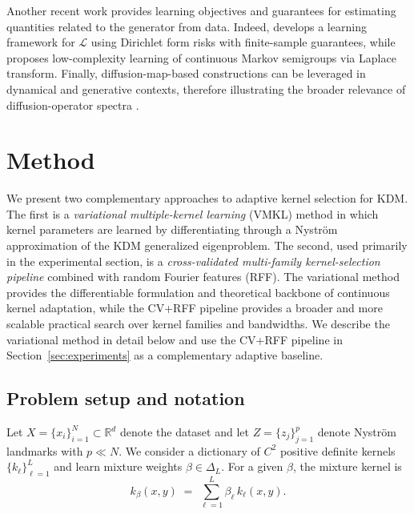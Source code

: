 \documentclass[11pt]{article}
\theoremstyle{remark}
\begin{document}
Another recent work provides learning objectives and guarantees for estimating quantities related to the generator from data. Indeed, \cite{NEURIPS2024_f930c6e1} develops a learning framework for $\mathcal{L}$ using Dirichlet form risks with finite-sample guarantees, while \cite{kostic2025laplacetransformbasedlowcomplexity} proposes low-complexity learning of continuous Markov semigroups via Laplace transform. Finally, diffusion-map-based constructions can be leveraged in dynamical and generative contexts, therefore illustrating the broader relevance of diffusion-operator spectra \citep{li2023diffusion}.

\section{Method}
\label{sec:method}

We present two complementary approaches to adaptive kernel selection for KDM.
The first is a \emph{variational multiple-kernel learning} (VMKL) method in which kernel
parameters are learned by differentiating through a Nystr\"om approximation of the KDM
generalized eigenproblem. The second, used primarily in the experimental section, is a
\emph{cross-validated multi-family kernel-selection pipeline} combined with random Fourier
features (RFF). The variational method provides the differentiable formulation and theoretical
backbone of continuous kernel adaptation, while the CV+RFF pipeline provides a broader and more
scalable practical search over kernel families and bandwidths. We describe the variational method
in detail below and use the CV+RFF pipeline in Section~\ref{sec:experiments} as a complementary adaptive baseline.

\subsection{Problem setup and notation}
\label{subsec:setup}

Let $X=\{x_i\}_{i=1}^N\subset\mathbb{R}^d$ denote the dataset and let $Z=\{z_j\}_{j=1}^p$ denote Nystr\"om landmarks with $p\ll N$.
We consider a dictionary of $C^2$ positive definite kernels $\{k_\ell\}_{\ell=1}^L$ and learn mixture weights $\beta\in\Delta_L$.
For a given $\beta$, the mixture kernel is
\begin{equation}
k_\beta(x,y) \;=\; \sum_{\ell=1}^L \beta_\ell\, k_\ell(x,y).
\label{eq:kbeta}
\end{equation}
\end{document}
